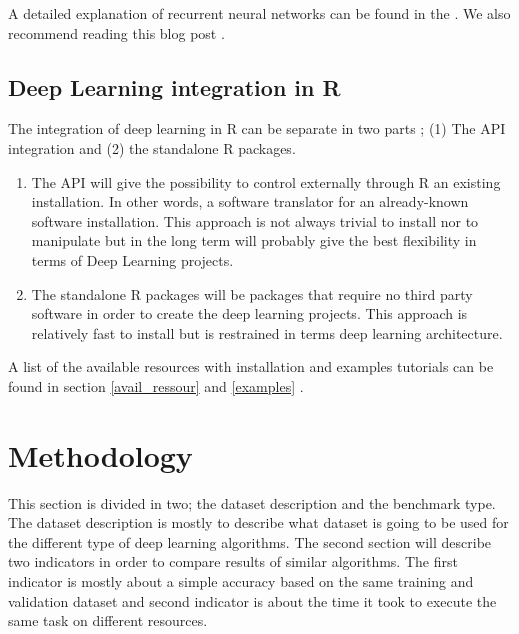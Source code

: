 \documentclass[letter,8pt]{article}\usepackage[]{graphicx}\usepackage[]{color}
\begin{document}
A detailed explanation of recurrent neural networks can be found in the  \cite[Chapter 10]{Goodfellow-et-al-2016}. We also recommend reading this blog post \cite{olah_2015}.


\subsection{Deep Learning integration in R}
\label{sec:deepinR}
The integration of deep learning in R can be separate in two parts ; (1) The API integration and (2) the standalone R packages. 
\begin{enumerate}
\item The API will give the possibility to control externally through R an existing installation. In other words, a software translator for an already-known software installation. This approach is not always trivial to install nor to manipulate but in the long term will probably give the best flexibility in terms of Deep Learning projects.
\item The standalone R packages will be packages that require no third party software in order to create the deep learning projects. This approach is relatively fast to install but is restrained in terms deep learning architecture.
\end{enumerate}
A list of the available resources with installation and examples tutorials can be found in section \ref{avail_ressour} and \ref{examples} .


\section{Methodology}
This section is divided in two;  the dataset description and the benchmark type. The dataset description is mostly to describe what dataset is going to be used for the different type of deep learning algorithms. The second section will describe two indicators in order to compare results of similar algorithms. The first indicator is mostly about a simple accuracy based on the same training and validation dataset and second indicator is about the time it took to execute the same task on different resources.
\end{document}
